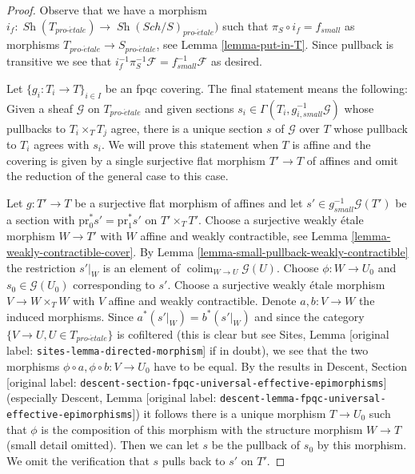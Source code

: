 \documentclass[10pt,a4paper]{article}
\theoremstyle{plain}
\theoremstyle{definition}
\theoremstyle{remark}
\numberwithin{equation}{subsection}
\def\colim{\mathop{\mathrm{colim}}\nolimits}
\def\Sch{\mathit{Sch}}
\def\Sh{\mathop{\mathit{Sh}}\nolimits}
\def\proetale{{pro\text{-}\acute{e}tale}}
\begin{document}
\begin{proof}
Observe that we have a morphism
$i_f : \Sh(T_\proetale) \to \Sh(\Sch/S)_\proetale)$
such that $\pi_S \circ i_f = f_{small}$ as morphisms
$T_\proetale \to S_\proetale$, see Lemma \ref{lemma-put-in-T}.
Since pullback is transitive we see that
$i_f^{-1} \pi_S^{-1}\mathcal{F} = f_{small}^{-1}\mathcal{F}$ as desired.

\medskip\noindent
Let $\{g_i : T_i \to T\}_{i \in I}$ be an fpqc covering. The final statement
means the following: Given a sheaf $\mathcal{G}$ on $T_\proetale$ and given
sections $s_i \in \Gamma(T_i, g_{i, small}^{-1}\mathcal{G})$ whose pullbacks
to $T_i \times_T T_j$ agree, there is a unique section $s$ of $\mathcal{G}$
over $T$ whose pullback to $T_i$ agrees with $s_i$. We will prove this
statement when $T$ is affine and the covering is given by a single
surjective flat morphism $T' \to T$ of affines and omit the reduction of
the general case to this case.

\medskip\noindent
Let $g : T' \to T$ be a surjective flat morphism of affines and let
$s' \in g_{small}^{-1}\mathcal{G}(T')$ be a section with
$\text{pr}_0^*s' = \text{pr}_1^*s'$ on $T' \times_T T'$.
Choose a surjective weakly \'etale morphism $W \to T'$ with
$W$ affine and weakly contractible, see
Lemma \ref{lemma-weakly-contractible-cover}. By
Lemma \ref{lemma-small-pullback-weakly-contractible}
the restriction $s'|_W$ is an element of $\colim_{W \to U} \mathcal{G}(U)$.
Choose $\phi : W \to U_0$ and $s_0 \in \mathcal{G}(U_0)$ corresponding to $s'$.
Choose a surjective weakly \'etale morphism $V \to W \times_T W$
with $V$ affine and weakly contractible.
Denote $a, b : V \to W$ the induced morphisms.
Since $a^*(s'|_W) = b^*(s'|_W)$ and since the category
$\{V \to U, U \in T_\proetale\}$ is cofiltered
(this is clear but see
Sites, Lemma \textnormal{[original label: \nolinkurl{sites-lemma-directed-morphism}]} if in doubt),
we see that the two morphisms $\phi \circ a , \phi \circ b : V \to U_0$
have to be equal. By the results in
Descent, Section \textnormal{[original label: \nolinkurl{descent-section-fpqc-universal-effective-epimorphisms}]}
(especially
Descent, Lemma \textnormal{[original label: \nolinkurl{descent-lemma-fpqc-universal-effective-epimorphisms}]})
it follows there is a unique morphism $T \to U_0$ such that $\phi$
is the composition of this morphism with the structure morphism $W \to T$
(small detail omitted). Then we can let $s$ be the pullback
of $s_0$ by this morphism. We omit the verification that
$s$ pulls back to $s'$ on $T'$.
\end{proof}
\end{document}
